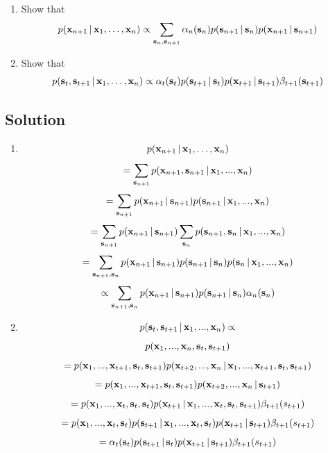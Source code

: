 \documentclass[submit]{harvardml}
\begin{document}
\begin{problem}
%
  \begin{enumerate}
    \item Show that
$$
p(\mathbf{x}_{n+1}\,|\, \mathbf{x}_1,\ldots,\mathbf{x}_n)
\propto\sum_{\mathbf{s}_n, \mathbf{s}_{n+1}}\alpha_n(\mathbf{s}_n)
p(\mathbf{s}_{n+1}\,|\, \mathbf{s}_n)
p(\mathbf{x}_{n+1}\,|\, \mathbf{s}_{n+1})$$

\item Show that
$$
p(\mathbf{s}_t,\mathbf{s}_{t+1}\,|\, \mathbf{x}_1,\ldots,\mathbf{x}_n)
  \propto\alpha_t(\mathbf{s}_t)p(\mathbf{s}_{t+1}\,|\,\mathbf{s}_t)p(\mathbf{x}_{t+1}\,|\,\mathbf{s}_{t+1})\beta_{t+1}(\mathbf{s}_{t+1})
$$
  \end{enumerate}
\end{problem}
\subsection*{Solution}
\begin{enumerate}
	\item 
	$$ p(\mathbf{x}_{n+1}\,|\, \mathbf{x}_1,\ldots,\mathbf{x}_n) $$
	$$ = \displaystyle\sum_{\mathbf{s}_{n+1}} p(\mathbf{x}_{n+1}, \mathbf{s}_{n+1}\,|\, \mathbf{x}_1,...,\mathbf{x}_{n}) $$ 
	$$ = \displaystyle\sum_{\mathbf{s}_{n+1}} p(\mathbf{x}_{n+1}\,|\, \mathbf{s}_{n+1}) p(\mathbf{s}_{n+1}\,|\, \mathbf{x}_1,...,\mathbf{x}_{n}) $$ 
	$$ = \displaystyle\sum_{\mathbf{s}_{n+1}} p(\mathbf{x}_{n+1}\,|\, \mathbf{s}_{n+1}) \displaystyle\sum_{\mathbf{s}_{n}}p(\mathbf{s}_{n+1}, \mathbf{s}_{n}\,|\, \mathbf{x}_1,...,\mathbf{x}_{n}) $$ 
	$$ = \displaystyle\sum_{\mathbf{s}_{n+1}, \mathbf{s}_{n}} p(\mathbf{x}_{n+1}\,|\, \mathbf{s}_{n+1}) p(\mathbf{s}_{n+1}\,|\, \mathbf{s}_{n})p(\mathbf{s}_{n}\,|\, \mathbf{x}_1,...,\mathbf{x}_n)$$ 
	$$ \propto \displaystyle\sum_{\mathbf{s}_{n+1}, \mathbf{s}_{n}} p(\mathbf{x}_{n+1}\,|\, \mathbf{s}_{n+1}) p(\mathbf{s}_{n+1}\,|\, \mathbf{s}_{n}) \alpha_n(\mathbf{s}_{n}) $$
	
	
	\item 
	$$ p(\mathbf{s}_{t}, \mathbf{s}_{t+1}\,|\, \mathbf{x}_1,...,\mathbf{x}_n) \propto $$
	$$ p(\mathbf{x}_1,...,\mathbf{x}_n,\mathbf{s}_{t}, \mathbf{s}_{t+1}) $$ 
	$$ = p(\mathbf{x}_1,...,\mathbf{x}_{t+1}, \mathbf{s}_{t}, \mathbf{s}_{t+1})p(\mathbf{x}_{t+2},...,\mathbf{x}_n\,|\, \mathbf{x}_1,...,\mathbf{x}_{t+1},\mathbf{s}_{t},\mathbf{s}_{t+1}) $$ 
	$$ = p(\mathbf{x}_1,...,\mathbf{x}_{t+1}, \mathbf{s}_{t}, \mathbf{s}_{t + 1})p(\mathbf{x}_{t+2},...,\mathbf{x}_n\,|\, \mathbf{s}_{t+1}) $$
	$$ = p(\mathbf{x}_1,...,\mathbf{x}_{t}, \mathbf{s}_{t}, \mathbf{s}_{t})p(\mathbf{x}_{t+1}\,|\, \mathbf{x}_1,...,\mathbf{x}_t,\mathbf{s}_{t}, \mathbf{s}_{t + 1})\beta_{t+1}(s_{t+1}) $$
	$$ = p(\mathbf{x}_1,...,\mathbf{x}_t,\mathbf{s}_t)p(\mathbf{s}_{t+1}\,|\, \mathbf{x}_1,...,\mathbf{x}_t,\mathbf{s}_t)p(\mathbf{x}_{t+1}\,|\, \mathbf{s}_{t+1})\beta_{t+1}(s_{t+1})$$
	$$ = \alpha_t(\mathbf{s}_t)p(\mathbf{s}_{t+1}\,|\, \mathbf{s}_t)p(\mathbf{x}_{t+1}\,|\, \mathbf{s}_{t+1})\beta_{t+1}(s_{t+1})$$
 

\end{enumerate}
\end{document}
